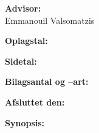 \begin{titlepage}
\begin{minipage}{0.4\textwidth}
\begin{description}
			\item {\bf Advisor:}\\
			Emmanouil Valsomatzis\\

			\item {\bf Oplagstal:} \rprints
			\item {\bf Sidetal:} \rlastpage
			\item {\bf Bilagsantal og --art:} \rappendices
			\item {\bf Afsluttet den:} \rdeadline
		\end{description}
	\end{minipage}
	\hfill
	\begin{minipage}{0.4\textwidth}
		\textbf{Synopsis:}\bigskip\bigskip
		\vfill
		\fbox{
		\begin{minipage}{\textwidth}
			\vspace{5pt}
			\small 
			\vspace{5pt}
		\end{minipage}}
	\end{minipage}
	\newline\newline\newline
\end{titlepage}
